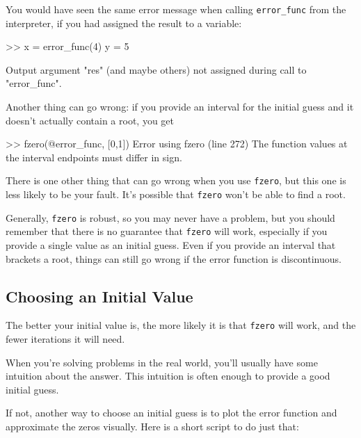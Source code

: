 
You would have seen the same error message when calling \lstinline{error_func} from the interpreter, if you had assigned the result to a variable:

\begin{code}
>> x = error_func(4)
y = 5

Output argument "res" (and maybe others) not assigned during
call to "error_func".
\end{code}

Another thing can go wrong: if you provide an interval for the
initial guess and it doesn't actually contain a root, you get

\begin{code}
>> fzero(@error_func, [0,1])
Error using fzero (line 272)
The function values at the interval endpoints must differ in sign.
\end{code}


There is one other thing that can go wrong when you use \lstinline{fzero}, but
this one is less likely to be your fault.  It's possible that \lstinline{fzero}
won't be able to find a root.

Generally, \lstinline{fzero} is robust, so you may never have a problem, but you should remember that there is no guarantee that \lstinline{fzero} will work, especially  if you provide a single value as an initial guess.  Even if you provide an interval that brackets a root, things can still go wrong if the error function is discontinuous.


\subsection{Choosing an Initial Value}

The better your initial value is, the more likely it is that
\lstinline{fzero} will work, and the fewer iterations it will
need.

When you're solving problems in the real world, you'll usually
have some intuition about the answer.  This intuition is often enough
to provide  a good initial guess.

If not, another way to choose an initial guess is to plot the error function and
approximate the zeros visually.  Here is a short script to do just that:



